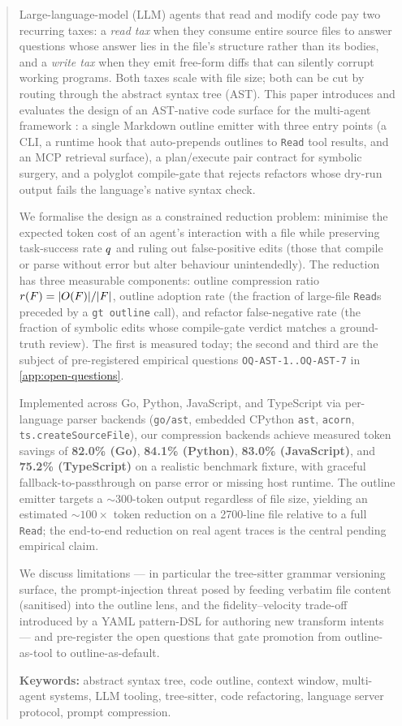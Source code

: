 \begin{abstract}
\noindent
Large-language-model (LLM) agents that read and modify code pay two
recurring taxes: a \emph{read tax} when they consume entire source files
to answer questions whose answer lies in the file's structure rather than
its bodies, and a \emph{write tax} when they emit free-form diffs that can
silently corrupt working programs. Both taxes scale with file size; both
can be cut by routing through the abstract syntax tree (AST). This paper
introduces and evaluates the design of an AST-native code surface for the
multi-agent framework \blackrim: a single Markdown outline emitter with
three entry points (a CLI, a runtime hook that auto-prepends outlines to
\texttt{Read} tool results, and an MCP retrieval surface), a
plan/execute pair contract for symbolic surgery, and a polyglot
compile-gate that rejects refactors whose dry-run output fails the
language's native syntax check.

We formalise the design as a constrained reduction problem: minimise the
expected token cost of an agent's interaction with a file while
preserving task-success rate $\success$ and ruling out false-positive
edits (those that compile or parse without error but alter behaviour
unintendedly). The reduction has three measurable components: outline
compression ratio $\ratio(\file) = |\outline(\file)|/|\file|$, outline
adoption rate (the fraction of large-file \texttt{Read}s preceded by a
\texttt{gt outline} call), and refactor false-negative rate (the fraction
of symbolic edits whose compile-gate verdict matches a ground-truth
review). The first is measured today; the second and third are the
subject of pre-registered empirical questions \texttt{OQ-AST-1..OQ-AST-7}
in \cref{app:open-questions}.

Implemented across Go, Python, JavaScript, and TypeScript via per-language
parser backends (\texttt{go/ast}, embedded CPython \texttt{ast},
\texttt{acorn}, \texttt{ts.createSourceFile}), our compression backends
achieve measured token savings of \textbf{82.0\% (Go)}, \textbf{84.1\%
(Python)}, \textbf{83.0\% (JavaScript)}, and \textbf{75.2\%
(TypeScript)} on a realistic benchmark fixture, with graceful
fallback-to-passthrough on parse error or missing host runtime. The
outline emitter targets a $\sim 300$-token output regardless of file
size, yielding an estimated $\sim 100\times$ token reduction on a
2700-line file relative to a full \texttt{Read}; the end-to-end
reduction on real agent traces is the central pending empirical claim.

We discuss limitations --- in particular the tree-sitter grammar
versioning surface, the prompt-injection threat posed by feeding
verbatim file content (sanitised) into the outline lens, and the
fidelity--velocity trade-off introduced by a YAML pattern-DSL for
authoring new transform intents --- and pre-register the open
questions that gate promotion from outline-as-tool to
outline-as-default.

\textbf{Keywords:} abstract syntax tree, code outline, context window,
multi-agent systems, LLM tooling, tree-sitter, code refactoring, language
server protocol, prompt compression.
\end{abstract}
